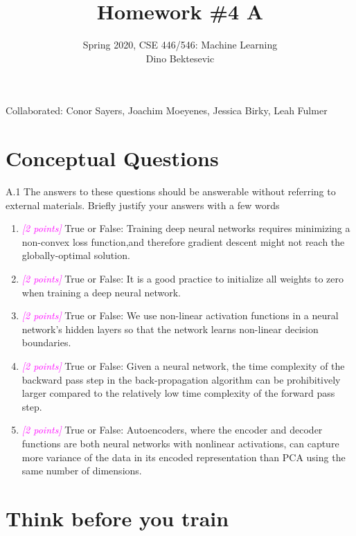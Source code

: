 \documentclass{article}
\date{{}}
\newcommand{\1}{\mathbf{1}}
\newcommand{\points}[1]{\small\textcolor{magenta}{\emph{[#1 points]}} \normalsize}
\begin{document}
\title{Homework \#4 A}
\author{\normalsize{Spring 2020, CSE 446/546: Machine Learning}\\
\normalsize{Dino Bektesevic}}
\maketitle

Collaborated: Conor Sayers, Joachim Moeyenes, Jessica Birky, Leah Fulmer

\section*{Conceptual Questions}
A.1 The answers to these questions should be answerable without referring to external materials. Briefly justify your answers with a few words
\begin{enumerate}
    \item \points{2} True or False: Training deep neural networks requires minimizing a non-convex loss function,and therefore gradient descent might not reach the globally-optimal solution.
    \item \points{2} True or False: It is a good practice to initialize all weights to zero when training a deep neural network.
    \item \points{2} True or False: We use non-linear activation functions in a neural network’s hidden layers so that the network learns non-linear decision boundaries.
    \item \points{2}  True or False: Given a neural network, the time complexity of the backward pass step in the back-propagation algorithm can be prohibitively larger compared to the relatively low time complexity of the forward pass step.
    \item \points{2} True or False: Autoencoders, where the encoder and decoder functions are both neural networks with nonlinear activations, can capture more variance of the data in its encoded representation than PCA using the same number of dimensions.
\end{enumerate}



\section*{Think before you train}
\end{document}
